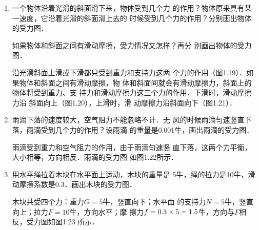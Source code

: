 \begin{enumerate}
\item 一个物体沿着光滑的斜面滑下来，物体受到几个力
的作用？物体原来具有某一速度，它沿着光滑的斜面滑上去的
时候受到几个力的作用？分别画出物体的受力图．

    如果物体和斜面之间有滑动摩擦，受力情况又怎样？再分
别画出物体的受力图．

\begin{solution}
    沿光滑斜面上滑或下滑都只受到重力和支持力这两
个力的作用（图1.19）．如果物体和斜面之间有滑动摩擦，物
体和斜面间就会有滑动摩擦力，斜面上的物体将受到重力、支
持力和滑动摩擦力这三个力的作用．下滑时，滑动摩擦力沿
斜面向上（图1.20），上滑时，滑
动摩擦力沿斜面向下（图1.21）．
\end{solution}
\item 雨滴下落的速度较大，空气阻力不能忽略不计．无
风的时候雨滴匀速竖直下落，雨滴受到几个力的作用？设雨滴
的重量是0.001牛，画出雨滴的受力图．

\begin{solution}
    雨滴受到重力和空气阻力的作用，由于雨滴匀速竖
    直下落，这两个力平衡，大小相等，方向相反．雨滴的受力图
    如图1.22所示．
\end{solution}
\item 用水平绳拉着木块在水平面上运动，木块的重量是
5牛，绳的拉力是10牛，滑动摩擦系数是0.3．画出木块的受力图．


\begin{solution}
    木块共受四个力：重力$G=5$牛，竖直向下；水平面
的支持力$N=5$牛，竖直向上；拉力$F=10$牛，方向水平；摩
擦力$f=0.3\times5=1.5$牛，方向与$F$相反，受力图如图1.23
所示．


\end{solution}

\begin{figure}[htp]\centering
    \begin{minipage}[t]{0.48\textwidth}
    \centering
{}
    \caption{}
    \end{minipage}
    \begin{minipage}[t]{0.48\textwidth}
    \centering
{}
    \caption{}
    \end{minipage}
    \end{figure}


\end{enumerate}
